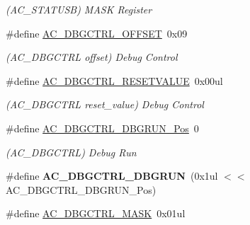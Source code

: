 \begin{DoxyCompactItemize}
\begin{DoxyCompactList}\small\item\em (A\+C\+\_\+\+S\+T\+A\+T\+U\+S\+B) M\+A\+S\+K Register \end{DoxyCompactList}\item 
\hypertarget{group___s_a_m_l21___a_c_ga69363893cfacb917641cebeda802c472}{}\#define \hyperlink{group___s_a_m_l21___a_c_ga69363893cfacb917641cebeda802c472}{A\+C\+\_\+\+D\+B\+G\+C\+T\+R\+L\+\_\+\+O\+F\+F\+S\+E\+T}~0x09\label{group___s_a_m_l21___a_c_ga69363893cfacb917641cebeda802c472}

\begin{DoxyCompactList}\small\item\em (A\+C\+\_\+\+D\+B\+G\+C\+T\+R\+L offset) Debug Control \end{DoxyCompactList}\item 
\hypertarget{group___s_a_m_l21___a_c_ga28fb1da99e1b90257b2781ccfa96444b}{}\#define \hyperlink{group___s_a_m_l21___a_c_ga28fb1da99e1b90257b2781ccfa96444b}{A\+C\+\_\+\+D\+B\+G\+C\+T\+R\+L\+\_\+\+R\+E\+S\+E\+T\+V\+A\+L\+U\+E}~0x00ul\label{group___s_a_m_l21___a_c_ga28fb1da99e1b90257b2781ccfa96444b}

\begin{DoxyCompactList}\small\item\em (A\+C\+\_\+\+D\+B\+G\+C\+T\+R\+L reset\+\_\+value) Debug Control \end{DoxyCompactList}\item 
\hypertarget{group___s_a_m_l21___a_c_gadbf4394f54e90e39f863e9c8662c0f5e}{}\#define \hyperlink{group___s_a_m_l21___a_c_gadbf4394f54e90e39f863e9c8662c0f5e}{A\+C\+\_\+\+D\+B\+G\+C\+T\+R\+L\+\_\+\+D\+B\+G\+R\+U\+N\+\_\+\+Pos}~0\label{group___s_a_m_l21___a_c_gadbf4394f54e90e39f863e9c8662c0f5e}

\begin{DoxyCompactList}\small\item\em (A\+C\+\_\+\+D\+B\+G\+C\+T\+R\+L) Debug Run \end{DoxyCompactList}\item 
\hypertarget{group___s_a_m_l21___a_c_gaf056bd9416e66b1eff71749194e229f2}{}\#define {\bfseries A\+C\+\_\+\+D\+B\+G\+C\+T\+R\+L\+\_\+\+D\+B\+G\+R\+U\+N}~(0x1ul $<$$<$ A\+C\+\_\+\+D\+B\+G\+C\+T\+R\+L\+\_\+\+D\+B\+G\+R\+U\+N\+\_\+\+Pos)\label{group___s_a_m_l21___a_c_gaf056bd9416e66b1eff71749194e229f2}

\item 
\hypertarget{group___s_a_m_l21___a_c_gaa892616a52af86d5390677c339647575}{}\#define \hyperlink{group___s_a_m_l21___a_c_gaa892616a52af86d5390677c339647575}{A\+C\+\_\+\+D\+B\+G\+C\+T\+R\+L\+\_\+\+M\+A\+S\+K}~0x01ul\label{group___s_a_m_l21___a_c_gaa892616a52af86d5390677c339647575}


\end{DoxyCompactItemize}
